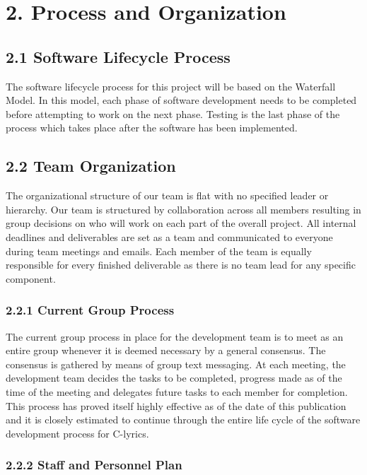 \documentclass[]{article}
\begin{document}
\section{2. Process and Organization}\label{process-and-organization}

\subsection{2.1 Software Lifecycle
Process}\label{software-lifecycle-process}

The software lifecycle process for this project will be based on the
Waterfall Model. In this model, each phase of software development needs
to be completed before attempting to work on the next phase. Testing is
the last phase of the process which takes place after the software has
been implemented.

\subsection{2.2 Team Organization}\label{team-organization}

The organizational structure of our team is flat with no specified
leader or hierarchy. Our team is structured by collaboration across all
members resulting in group decisions on who will work on each part of
the overall project. All internal deadlines and deliverables are set as
a team and communicated to everyone during team meetings and emails.
Each member of the team is equally responsible for every finished
deliverable as there is no team lead for any specific component.

\subsubsection{2.2.1 Current Group Process}\label{current-group-process}

The current group process in place for the development team is to meet
as an entire group whenever it is deemed necessary by a general
consensus. The consensus is gathered by means of group text messaging.
At each meeting, the development team decides the tasks to be completed,
progress made as of the time of the meeting and delegates future tasks
to each member for completion. This process has proved itself highly
effective as of the date of this publication and it is closely estimated
to continue through the entire life cycle of the software development
process for C-lyrics.

\subsubsection{2.2.2 Staff and Personnel
Plan}\label{staff-and-personnel-plan}
\end{document}
